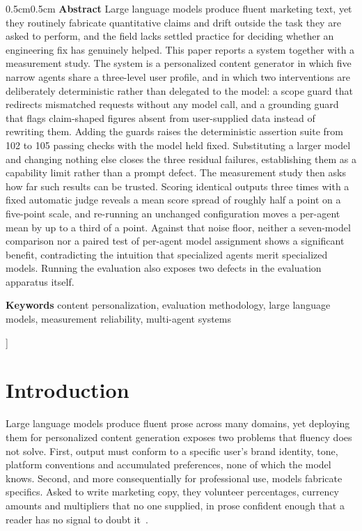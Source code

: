 \documentclass[9pt,twocolumn]{extarticle}
\begin{document}
\begin{@twocolumnfalse}
  \begin{adjustwidth}{0.5cm}{0.5cm}
  \noindent\textbf{Abstract}\quad
  Large language models produce fluent marketing text, yet they routinely
  fabricate quantitative claims and drift outside the task they are asked to
  perform, and the field lacks settled practice for deciding whether an
  engineering fix has genuinely helped. This paper reports a system together
  with a measurement study. The system is a personalized content generator in
  which five narrow agents share a three-level user profile, and in which two
  interventions are deliberately deterministic rather than delegated to the
  model: a scope guard that redirects mismatched requests without any model
  call, and a grounding guard that flags claim-shaped figures absent from
  user-supplied data instead of rewriting them. Adding the guards raises the
  deterministic assertion suite from 102 to 105 passing checks with the model
  held fixed. Substituting a larger model and changing nothing else closes the
  three residual failures, establishing them as a capability limit rather than
  a prompt defect. The measurement study then asks how far such results can be
  trusted. Scoring identical outputs three times with a fixed automatic judge
  reveals a mean score spread of roughly half a point on a five-point scale,
  and re-running an unchanged configuration moves a per-agent mean by up to a
  third of a point. Against that noise floor, neither a seven-model comparison
  nor a paired test of per-agent model assignment shows a significant benefit,
  contradicting the intuition that specialized agents merit specialized
  models. Running the evaluation also exposes two defects in the evaluation
  apparatus itself.
  \par\vspace{5pt}
  \noindent\textbf{Keywords}\quad
  content personalization, evaluation methodology, large language models,
  measurement reliability, multi-agent systems
  \end{adjustwidth}
  \vspace{12pt}
  \end{@twocolumnfalse}
]

\section{Introduction}

Large language models produce fluent prose across many domains, yet deploying
them for personalized content generation exposes two problems that fluency does
not solve. First, output must conform to a specific user's brand identity,
tone, platform conventions and accumulated preferences, none of which the model
knows. Second, and more consequentially for professional use, models fabricate
specifics. Asked to write marketing copy, they volunteer percentages, currency
amounts and multipliers that no one supplied, in prose confident enough that a
reader has no signal to doubt it~\cite{ji2023hallucination}.
\end{document}
